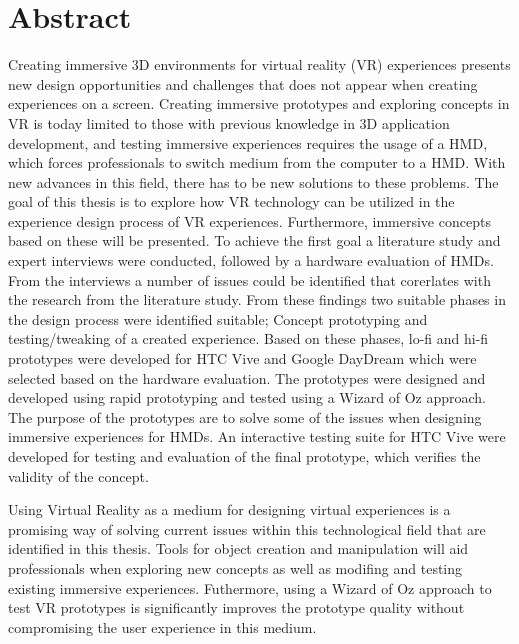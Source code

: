 \chapter{Abstract}
Creating immersive 3D environments for virtual reality (VR) experiences presents new design opportunities and challenges that does not appear when creating experiences on a screen. Creating immersive prototypes and exploring concepts in VR is today limited to those with previous knowledge in 3D application development, and testing immersive experiences requires the usage of a HMD, which forces professionals to switch medium from the computer to a HMD. With new advances in this field, there has to be new solutions to these problems. The goal of this thesis is to explore how VR technology can be utilized in the experience design process of VR experiences. Furthermore, immersive concepts based on these will be presented. To achieve the first goal a literature study and expert interviews were conducted, followed by a hardware evaluation of HMDs. From the interviews a number of issues could be identified that corerlates with the research from the literature study. From these findings two suitable phases in the design process were identified suitable; Concept prototyping and testing/tweaking of a created experience. Based on these phases, lo-fi and hi-fi prototypes were developed for HTC Vive and Google DayDream which were selected based on the hardware evaluation. The prototypes were designed and developed using rapid prototyping and tested using a Wizard of Oz approach. The purpose of the prototypes are to solve some of the issues when designing immersive experiences for HMDs. An interactive testing suite for HTC Vive were developed for testing and evaluation of the final prototype, which verifies the validity of the concept.

Using Virtual Reality as a medium for designing virtual experiences is a promising way of solving current issues within this technological field that are identified in this thesis. Tools for object creation and manipulation will aid professionals when exploring new concepts as well as modifing and testing existing immersive experiences. Futhermore, using a Wizard of Oz approach to test VR prototypes is significantly improves the prototype quality without compromising the user experience in this medium.  
